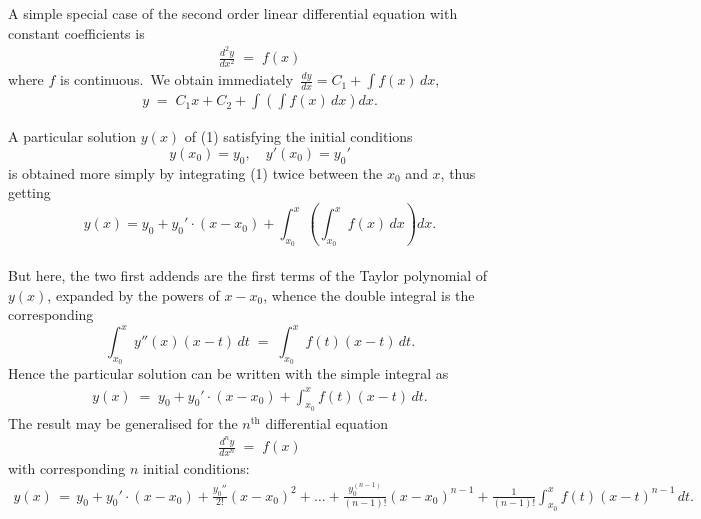 \documentclass[12pt]{article}
\theoremstyle{definition}
\begin{document}
A simple special case of the second order linear differential equation with constant coefficients is
\begin{align}
\frac{d^2y}{dx^2} \;=\; f(x)
\end{align}
where $f$ is continuous.\, We obtain immediately\, $\displaystyle\frac{dy}{dx} = C_1+\!\int\!f(x)\,dx$,
\begin{align}
 y \;=\; C_1x+C_2+\!\int\!\left(\int f(x)\,dx\right)dx.
\end{align}

A particular solution $y(x)$ of (1) satisfying the initial conditions
$$y(x_0) = y_0, \quad y'(x_0) = y_0'$$
is obtained more simply by integrating (1) twice between the  $x_0$ and $x$, thus getting
$$y(x) = y_0+y_0'\!\cdot\!(x\!-\!x_0)+\!\int_{x_0}^x\!\left(\int_{x_0}^x f(x)\,dx\right)dx.$$\\
But here, the two first addends are the first terms of the Taylor polynomial of $y(x)$, expanded by the powers of 
$x-x_0$, whence the double integral is the corresponding 
$$\int_{x_0}^x y''(x)(x\!-\!t)\,dt \;=\; \int_{x_0}^x f(t)(x\!-\!t)\,dt.$$
Hence the particular solution can be written with the simple integral as
\begin{align}
y(x) \;=\; y_0+y_0'\!\cdot\!(x\!-\!x_0)+\int_{x_0}^x f(t)(x\!-\!t)\,dt.
\end{align}
The result may be generalised for the $n^\mathrm{th}$  differential equation 
\begin{align}
\frac{d^ny}{dx^n} \;=\; f(x)
\end{align}
with corresponding $n$ initial conditions:
\begin{align}
y(x) \,=\, y_0\!+\!y_0'\!\cdot\!(x\!-\!x_0)\!+\!\frac{y_0''}{2!}(x\!-\!x_0)^2\!+\ldots
+\!\frac{y_0^{(n-1)}}{(n\!-\!1)!}(x\!-\!x_0)^{n-1}
\!+\!\frac{1}{(n\!-\!1)!}\int_{x_0}^x f(t)(x\!-\!t)^{n-1}\,dt.
\end{align}






\end{document}
